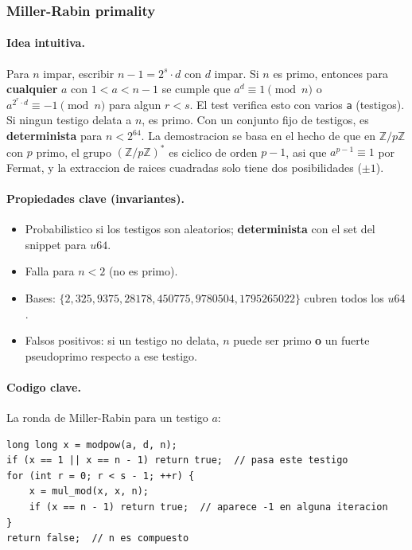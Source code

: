 ﻿\subsubsection{Miller-Rabin primality}

\paragraph{Idea intuitiva.}
Para $n$ impar, escribir $n - 1 = 2^s \cdot d$ con $d$ impar. Si $n$ es primo, entonces para \textbf{cualquier} $a$ con $1 < a < n-1$ se cumple que $a^d \equiv 1 \pmod n$ o $a^{2^r \cdot d} \equiv -1 \pmod n$ para algun $r < s$. El test verifica esto con varios \texttt{a} (testigos). Si ningun testigo delata a $n$, es primo. Con un conjunto fijo de testigos, es \textbf{determinista} para $n < 2^{64}$. La demostracion se basa en el hecho de que en $\mathbb{Z}/p\mathbb{Z}$ con $p$ primo, el grupo $(\mathbb{Z}/p\mathbb{Z})^*$ es ciclico de orden $p-1$, asi que $a^{p-1} \equiv 1$ por Fermat, y la extraccion de raices cuadradas solo tiene dos posibilidades ($\pm 1$).

\paragraph{Propiedades clave (invariantes).}
\begin{itemize}\setlength\itemsep{0pt}
	\item Probabilistico si los testigos son aleatorios; \textbf{determinista} con el set del snippet para $u64$.
	\item Falla para $n < 2$ (no es primo).
	\item Bases: $\{2, 325, 9375, 28178, 450775, 9780504, 1795265022\}$ cubren todos los $u64$.
	\item Falsos positivos: si un testigo no delata, $n$ puede ser primo \textbf{o} un fuerte pseudoprimo respecto a ese testigo.
\end{itemize}

\paragraph{Codigo clave.}
La ronda de Miller-Rabin para un testigo $a$:
\begin{verbatim}
long long x = modpow(a, d, n);
if (x == 1 || x == n - 1) return true;  // pasa este testigo
for (int r = 0; r < s - 1; ++r) {
    x = mul_mod(x, x, n);
    if (x == n - 1) return true;  // aparece -1 en alguna iteracion
}
return false;  // n es compuesto
\end{verbatim}


